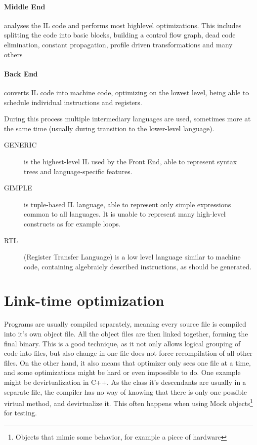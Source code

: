 \paragraph{Middle End} analyses the IL code and performs most highlevel
optimizations. This includes splitting the code into basic blocks, building a
control flow graph, dead code elimination, constant propagation, profile
driven transformations and many others 

\paragraph{Back End} converts IL code into machine code, optimizing on the
lowest level, being able to schedule individual instructions and registers.

During this process multiple intermediary languages are used, sometimes more at
the same time (usually during transition to the lower-level language).

\begin{description}
	\item[GENERIC] is the highest-level IL used by the Front End, able to
		represent syntax trees and language-specific features.
	\item[GIMPLE] is tuple-based IL language, able to represent only simple
		expressions common to all languages. It is unable to represent many
		high-level constructs as for example loops.
	\item[RTL] (Register Transfer Language) is a low level language similar to
		machine code, containing algebraicly described instructions, as should
		be generated.
\end{description}


\section{Link-time optimization}

Programs are usually compiled separately, meaning every source file is compiled
into it's own object file. All the object files are then linked together,
forming the final binary. This is a good technique, as it not only allows
logical grouping of code into files, but also change in one file does not force
recompilation of all other files. On the other hand, it also means that
optimizer only sees one file at a time, and some optimizations might be hard or
even impossible to do.  One example might be devirtualization in C++. As the
class it's descendants are usually in a separate file, the compiler has no way
of knowing that there is only one possible virtual method, and devirtualize it.
This often happens when using Mock objects\footnote{Objects that mimic some
behavior, for example a piece of hardware} for testing.

